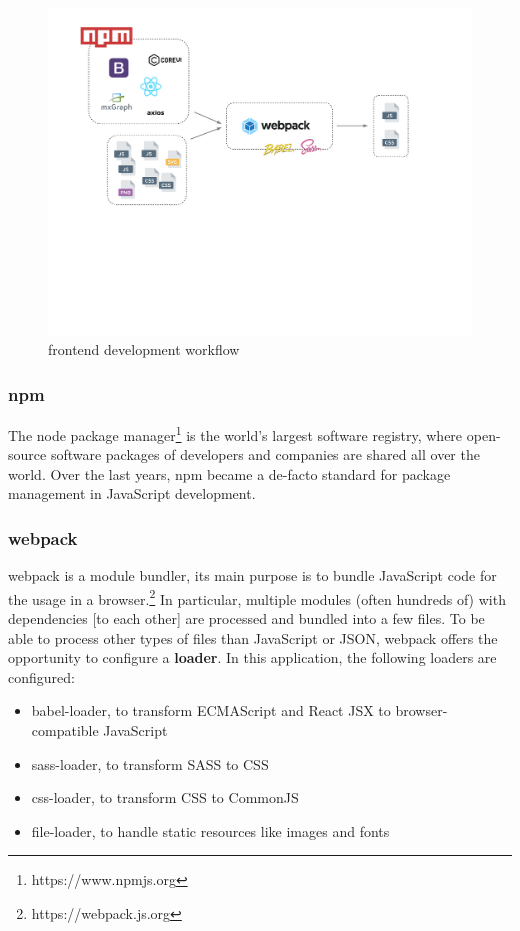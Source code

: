 \documentclass[a4paper,11pt,pdftex,halfparskip,cleardoubleempty]{scrbook}
\begin{document}
\begin{figure}[htbp]
  \centering
  \includegraphics[trim={0.8cm 8.2cm 3.0cm 1cm},scale=0.6]{frontend-setup}
  \caption{frontend development workflow}
\end{figure}

\subsubsection{npm}

The node package manager\footnote{https://www.npmjs.org} is the world's largest software registry, where open-source software packages of developers and companies are shared all over the world. Over the last years, npm became a de-facto standard for package management in JavaScript development.

\subsubsection{webpack}

webpack is a module bundler, its main purpose is to bundle JavaScript code for the usage in a browser.\footnote{https://webpack.js.org} In particular, multiple modules (often hundreds of) with dependencies [to each other] are processed and bundled into a few files. To be able to process other types of files than JavaScript or JSON, webpack offers the opportunity to configure a \textbf{loader}. In this application, the following loaders are configured:
\begin{itemize}
\item babel-loader, to transform ECMAScript and React JSX to browser-compatible JavaScript
\item sass-loader, to transform SASS to CSS
\item css-loader, to transform CSS to CommonJS
\item file-loader, to handle static resources like images and fonts
\end{itemize}
\end{document}
